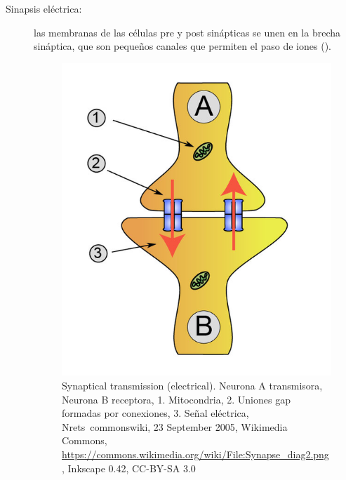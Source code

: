 \begin{description}
 \item [Sinapsis eléctrica:] las membranas de las células pre y post sinápticas se unen en la brecha sináptica, que son pequeños canales que permiten el paso de iones ().



\begin{figure}[h]
 \centering
 \includegraphics[scale=0.2]{../Figuras/sinapsisElectrica.png}
 \caption{Synaptical transmission (electrical). Neurona A transmisora, Neurona B receptora, 1. Mitocondria, 2. Uniones gap formadas por conexiones, 3. Señal eléctrica, Nrets~commonswiki, 23 September 2005, Wikimedia Commons, \url{https://commons.wikimedia.org/wiki/File:Synapse_diag2.png}, Inkscape 0.42, CC-BY-SA 3.0}
 \label{fig:sinapsisN}
\end{figure}
 

\end{description}
